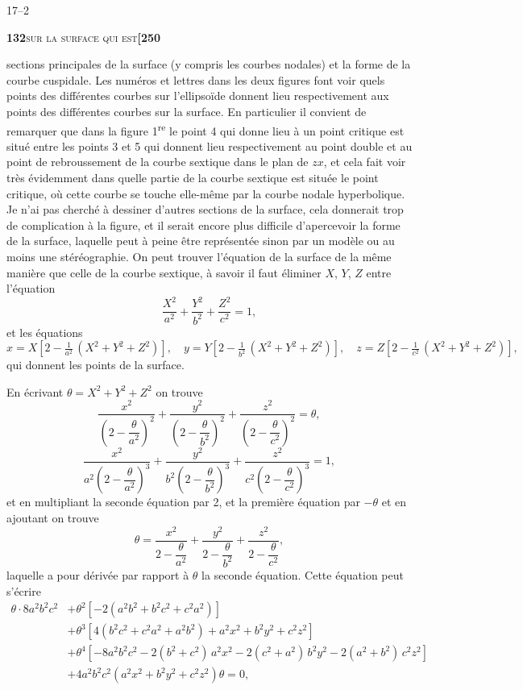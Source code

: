 \documentclass[11pt]{article}
\begin{document}
\hfill 17--2

\newpage

\noindent\textbf{132}\hfill\textsc{sur la surface qui est}\hfill\textbf{[250}

\medskip

\noindent sections principales de la surface (y compris les courbes nodales) et la forme de la courbe cuspidale. Les numéros et lettres dans les deux figures font voir quels points des différentes courbes sur l'ellipsoïde donnent lieu respectivement aux points des différentes courbes sur la surface. En particulier il convient de remarquer que dans la figure 1\textsuperscript{re} le point 4 qui donne lieu à un point critique est situé entre les points 3 et 5 qui donnent lieu respectivement au point double et au point de rebroussement de la courbe sextique dans le plan de $zx$, et cela fait voir très évidemment dans quelle partie de la courbe sextique est située le point critique, où cette courbe se touche elle-même par la courbe nodale hyperbolique. Je n'ai pas cherché à dessiner d'autres sections de la surface, cela donnerait trop de complication à la figure, et il serait encore plus difficile d'apercevoir la forme de la surface, laquelle peut à peine être représentée sinon par un modèle ou au moins une stéréographie. On peut trouver l'équation de la surface de la même manière que celle de la courbe sextique, à savoir il faut éliminer $X$, $Y$, $Z$ entre l'équation
\[
\frac{X^2}{a^2} + \frac{Y^2}{b^2} + \frac{Z^2}{c^2} = 1,
\]
et les équations
\[
x = X\left[2 - \tfrac{1}{a^2}\,(X^2+Y^2+Z^2)\right],\quad y = Y\left[2 - \tfrac{1}{b^2}\,(X^2+Y^2+Z^2)\right],\quad z = Z\left[2 - \tfrac{1}{c^2}\,(X^2+Y^2+Z^2)\right],
\]
qui donnent les points de la surface.

En écrivant $\theta = X^2 + Y^2 + Z^2$ on trouve
\[
\frac{x^2}{\left(2-\dfrac{\theta}{a^2}\right)^2} + \frac{y^2}{\left(2-\dfrac{\theta}{b^2}\right)^2} + \frac{z^2}{\left(2-\dfrac{\theta}{c^2}\right)^2} = \theta,
\]
\[
\frac{x^2}{a^2\left(2-\dfrac{\theta}{a^2}\right)^3} + \frac{y^2}{b^2\left(2-\dfrac{\theta}{b^2}\right)^3} + \frac{z^2}{c^2\left(2-\dfrac{\theta}{c^2}\right)^3} = 1,
\]
et en multipliant la seconde équation par 2, et la première équation par $-\theta$ et en ajoutant on trouve
\[
\theta = \frac{x^2}{2-\dfrac{\theta}{a^2}} + \frac{y^2}{2-\dfrac{\theta}{b^2}} + \frac{z^2}{2-\dfrac{\theta}{c^2}},
\]
laquelle a pour dérivée par rapport à $\theta$ la seconde équation. Cette équation peut s'écrire
\begin{align*}
\theta\cdot 8a^2b^2c^2 &+ \theta^2[-2(a^2b^2+b^2c^2+c^2a^2)]\\
&+ \theta^3[4(b^2c^2 + c^2a^2 + a^2b^2) + a^2x^2 + b^2y^2 + c^2z^2]\\
&+ \theta^4[-8a^2b^2c^2 - 2(b^2+c^2)\,a^2x^2 - 2(c^2+a^2)\,b^2y^2 - 2(a^2+b^2)\,c^2z^2]\\
&+ 4a^2b^2c^2(a^2x^2 + b^2y^2 + c^2z^2)\theta = 0,
\end{align*}
\end{document}
